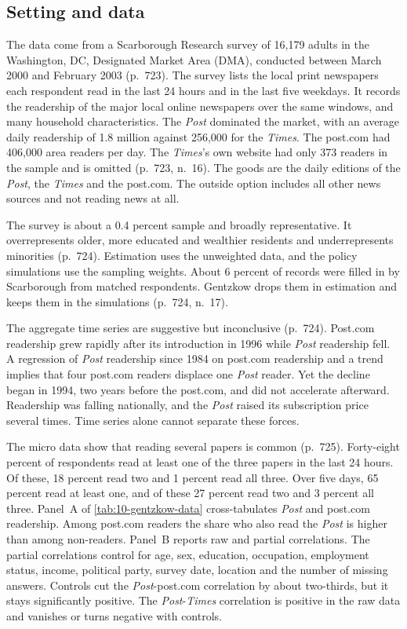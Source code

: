\subsection{Setting and data}\label{sec:10-gentzkow-data}

The data come from a Scarborough Research survey of 16,179 adults in the Washington, DC, Designated Market Area (DMA),
conducted between March 2000 and February 2003 (p.~723). The survey lists the local print newspapers each respondent
read in the last 24 hours and in the last five weekdays. It records the readership of the major local online newspapers
over the same windows, and many household characteristics. The \textit{Post} dominated the market, with an average daily readership
of 1.8 million against 256,000 for the \textit{Times}. The post.com had 406,000 area readers per day. The
\textit{Times}'s own website had only 373 readers in the sample and is omitted (p.~723, n.~16). The goods are the daily
editions of the \textit{Post}, the \textit{Times} and the post.com. The outside option includes all other news
sources and not reading news at all.

The survey is about a 0.4 percent sample and broadly representative. It overrepresents older, more educated and
wealthier residents and underrepresents minorities (p.~724). Estimation uses the unweighted data, and the policy
simulations use the sampling weights. About 6 percent of records were filled in by Scarborough from matched
respondents. Gentzkow drops them in estimation and keeps them in the simulations (p.~724, n.~17).

The aggregate time series are suggestive but inconclusive (p.~724). Post.com readership grew rapidly after its
introduction in 1996 while \textit{Post} readership fell. A regression of \textit{Post} readership since 1984 on
post.com readership and a trend implies that four post.com readers displace one \textit{Post} reader. Yet the decline
began in 1994, two years before the post.com, and did not accelerate afterward. Readership was falling nationally, and
the \textit{Post} raised its subscription price several times. Time series alone cannot separate these forces.

The micro data show that reading several papers is common (p.~725). Forty-eight percent of respondents read at least
one of the three papers in the last 24 hours. Of these, 18 percent read two and 1 percent read all three. Over five
days, 65 percent read at least one, and of these 27 percent read two and 3 percent all three. Panel~A of
\cref{tab:10-gentzkow-data} cross-tabulates \textit{Post} and post.com readership. Among post.com readers the share who
also read the \textit{Post} is higher than among non-readers. Panel~B reports raw and partial correlations. The partial
correlations control for age, sex, education, occupation, employment status, income, political party, survey date,
location and the number of missing answers. Controls cut the \textit{Post}-post.com correlation by about two-thirds,
but it stays significantly positive. The \textit{Post}-\textit{Times} correlation is positive in the raw data and
vanishes or turns negative with controls.

